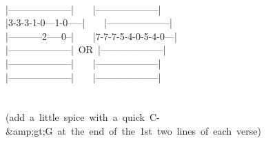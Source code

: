{\\
|--------------------|\ \ \ \ |--------------------|\\
|3-3-3-1-0---1-0-----|\ \ \ \ |--------------------|\\
|-----------2-----0--|\ \ \ \ |7-7-7-5-4-0-5-4-0---|\\
|--------------------|\ OR\ |--------------------|\\
|--------------------|\ \ \ \ |--------------------|\\
|--------------------|\ \ \ \ |--------------------|\\
\\
\\
(add\ a\ little\ spice\ with\ a\ quick\ C-\&amp;gt;G\ at\ the\ end\ of\ the\ 1st\ two\ lines\ of\ each\ verse)\ }
